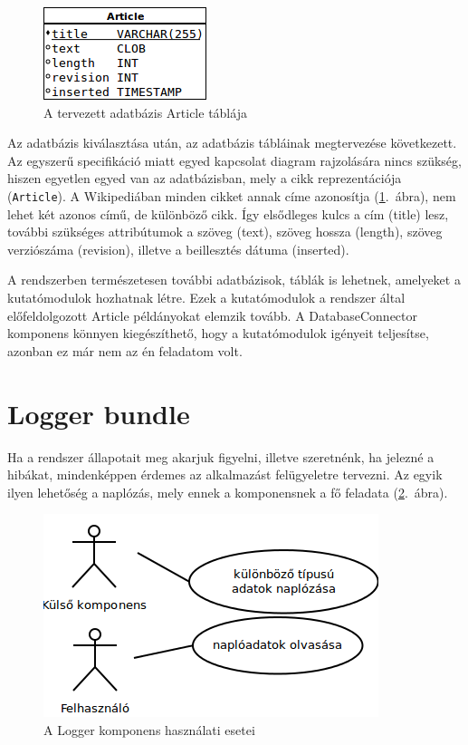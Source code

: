 \begin{figure}[htp]
\centering
\includegraphics[scale=0.8]{img/database_article}
\caption{A tervezett adatbázis Article táblája}
\label{fig:database_article}
\end{figure}

Az adatbázis kiválasztása után, az adatbázis tábláinak megtervezése következett. Az egyszerű specifikáció miatt egyed kapcsolat diagram rajzolására nincs szükség, hiszen egyetlen egyed van az adatbázisban, mely a cikk reprezentációja (\texttt{Article}). A Wikipediában minden cikket annak címe azonosítja (\ref{fig:database_article}.~ábra), nem lehet két azonos című, de különböző cikk. Így elsődleges kulcs a cím (title) lesz, további szükséges attribútumok a szöveg (text), szöveg hossza (length), szöveg verziószáma (revision), illetve a beillesztés dátuma (inserted).

A rendszerben természetesen további adatbázisok, táblák is lehetnek, amelyeket a kutatómodulok hozhatnak létre. Ezek a kutatómodulok a rendszer által előfeldolgozott Article példányokat elemzik tovább. A DatabaseConnector komponens könnyen kiegészíthető, hogy a kutatómodulok igényeit teljesítse, azonban ez már nem az én feladatom volt.


\section{Logger bundle}
\label{sec:loggerbundle}

Ha a rendszer állapotait meg akarjuk figyelni, illetve szeretnénk, ha jelezné a hibákat, mindenképpen érdemes az alkalmazást felügyeletre tervezni. Az egyik ilyen lehetőség a naplózás, mely ennek a komponensnek a fő feladata (\ref{fig:usecase_logger}.~ábra).

\begin{figure}[htp]
\centering
\includegraphics[scale=0.6]{img/usecase_logger}
\caption{A Logger komponens használati esetei}
\label{fig:usecase_logger}
\end{figure}

